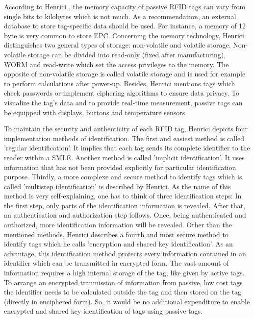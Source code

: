 According to Henrici \cite{henrici}, the memory capacity of passive RFID tags can vary from single bits to kilobytes which is not much. As a recommendation, an external database to store tag-specific data should be used. For instance, a memory of 12 byte is very common to store \ac{EPC}. Concerning the memory technology, Henrici distinguishes two general types of storage: non-volatile and volatile storage. Non-volatile storage can be divided into read-only (fixed after manufacturing), \ac{WORM} and read-write which set the access privileges to the memory. The opposite of non-volatile storage is called volatile storage and is used for example to perform calculations after power-up. Besides, Henrici mentions tags which check passwords or implement ciphering algorithms to ensure data privacy. To visualize the tag's data and to provide real-time measurement, passive tags can be equipped with displays, buttons and temperature sensors. 

To maintain the security and authenticity of each RFID tag, Henrici \cite[p.93 ff.]{henrici} depicts four implementation methods of identification. 
The first and easiest method is called 'regular identification'. It implies that each tag sends its complete identifier to the reader within a \ac{SMLE}. Another method is called 'implicit identification'. It uses information that has not been provided explicitly for particular identification purpose. Thirdly, a more complexe and secure method to identify tags which is called 'multistep identification' is described by Henrici. As the name of this method is very self-explaining, one has to think of three identification steps: In the first step, only parts of the identification information is revealed. After that, an authentication and authorization step follows. Once, being authenticated and authorized, more identification information will be revealed. 
Other than the mentioned methods, Henrici describes a fourth and most secure method to identify tags which he calls 'encryption and shared key identification'. As an advantage, this identification method protects every information contained in an identifier which can be transmitted in encrypted form. The vast amount of information requires a high internal storage of the tag, like given by active tags. To arrange an encrypted tranmission of information from passive, low cost tags the identifier needs to be calculated outside the tag and then stored on the tag (directly in enciphered form). So, it would be no additional expenditure to enable encrypted and shared key identification of tags using passive tags. 

